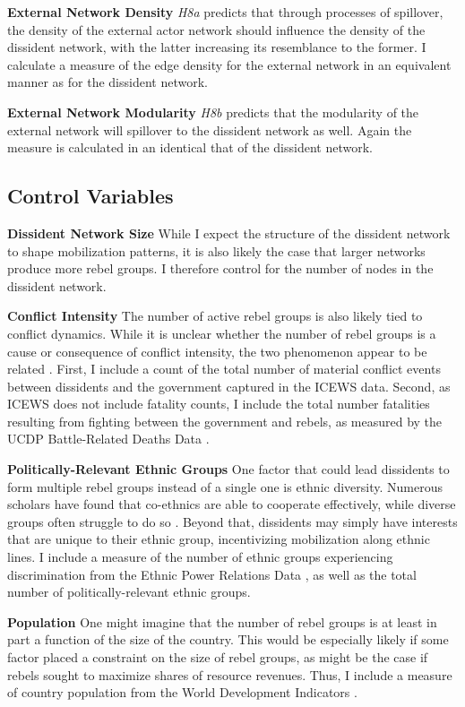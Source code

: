 \textbf{External Network Density} \textit{H8a} predicts that through processes of spillover, the density of the external actor network should influence the density of the dissident network, with the latter increasing its resemblance to the former. I calculate a measure of the edge density for the external network in an equivalent manner as for the dissident network.

\textbf{External Network Modularity} \textit{H8b} predicts that the modularity of the external network will spillover to the dissident network as well. Again the measure is calculated in an identical that of the dissident network.

\subsection{Control Variables}

\textbf{Dissident Network Size} While I expect the structure of the dissident network to shape mobilization patterns, it is also likely the case that larger networks produce more rebel groups. I therefore control for the number of nodes in the dissident network.

\textbf{Conflict Intensity} The number of active rebel groups is also likely tied to conflict dynamics. While it is unclear whether the number of rebel groups is a cause or consequence of conflict intensity, the two phenomenon appear to be related \citep{Akcinaroglu2012a}. First, I include a count of the total number of material conflict events between dissidents and the government captured in the ICEWS data. Second, as ICEWS does not include fatality counts, I include the total number fatalities resulting from fighting between the government and rebels, as measured by the UCDP Battle-Related Deaths Data \citep{Sundberg2008a}.

\textbf{Politically-Relevant Ethnic Groups} One factor that could lead dissidents to form multiple rebel groups instead of a single one is ethnic diversity. Numerous scholars have found that co-ethnics are able to cooperate effectively, while diverse groups often struggle to do so \citep[e.g.][]{Habyarimana2012}. Beyond that, dissidents may simply have interests that are unique to their ethnic group, incentivizing mobilization along ethnic lines. I include a measure of the number of ethnic groups experiencing discrimination from the Ethnic Power Relations Data \citep{Vogt2015}, as well as the total number of politically-relevant ethnic groups.

\textbf{Population} One might imagine that the number of rebel groups is at least in part a function of the size of the country. This would be especially likely if some factor placed a constraint on the size of rebel groups, as might be the case if rebels sought to maximize shares of resource revenues. Thus, I include a measure of country population from the World Development Indicators \citep{Bank2015}.

